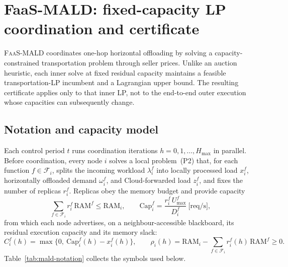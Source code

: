\section{FaaS-MALD: fixed-capacity LP coordination and certificate}
\label{sec:mald}

\textsc{FaaS-MALD} coordinates one-hop horizontal offloading by solving a
capacity-constrained transportation problem through seller prices. Unlike an
auction heuristic, each inner solve at fixed residual capacity maintains a
feasible transportation-LP incumbent and a Lagrangian upper bound. The resulting
certificate applies only to that inner LP, not to the end-to-end outer execution
whose capacities can subsequently change.

\subsection{Notation and capacity model}
\label{sec:mald-notation}

Each control period $t$ runs coordination iterations $h=0,1,\dots,H_{\max}$ in
parallel. Before coordination, every node $i$ solves a local problem~(P2)
that, for each function $f\in\mathcal{F}_i$, splits the incoming workload
$\lambda_i^f$ into locally processed load $x_i^f$, horizontally offloaded
demand $\omega_i^f$, and Cloud-forwarded load $z_i^f$, and fixes the number of
replicas $r_i^f$. Replicas obey the memory budget and provide capacity
\begin{equation*}
  \sum_{f\in\mathcal{F}_i} r_i^f\,\mathrm{RAM}^f \le \mathrm{RAM}_i,
  \qquad
  \mathrm{Cap}_i^f = \frac{r_i^f\,U^f_{\max}}{D_i^f}\ \text{[req/s]} ,
  \tag*{(1,2)}
\end{equation*}
from which each node advertises, on a neighbour-accessible blackboard, its
residual execution capacity and its memory slack:
\begin{equation*}
  C_i^f(h) = \max\!\big\{0,\ \mathrm{Cap}_i^f(h) - x_i^f(h)\big\},
  \qquad
  \rho_i(h) = \mathrm{RAM}_i - \sum_{f\in\mathcal{F}_i} r_i^f(h)\,\mathrm{RAM}^f \ge 0 .
  \tag*{(12,13)}
\end{equation*}
Table~\ref{tab:mald-notation} collects the symbols used below.

